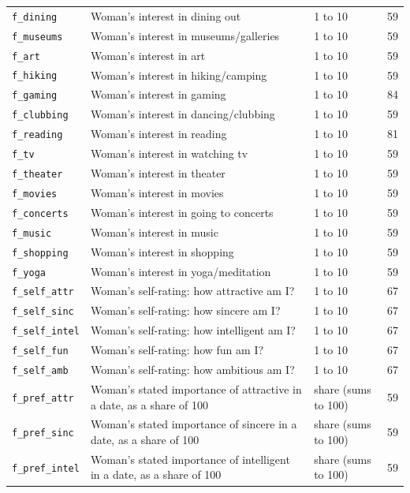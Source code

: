 \documentclass[11pt]{article}
\begin{document}
\begin{longtable}{L{3.3cm}L{8.2cm}L{2.4cm}r}
\texttt{f\_dining} & Woman's interest in dining out & 1 to 10 & 59 \\
\texttt{f\_museums} & Woman's interest in museums/galleries & 1 to 10 & 59 \\
\texttt{f\_art} & Woman's interest in art & 1 to 10 & 59 \\
\texttt{f\_hiking} & Woman's interest in hiking/camping & 1 to 10 & 59 \\
\texttt{f\_gaming} & Woman's interest in gaming & 1 to 10 & 84 \\
\texttt{f\_clubbing} & Woman's interest in dancing/clubbing & 1 to 10 & 59 \\
\texttt{f\_reading} & Woman's interest in reading & 1 to 10 & 81 \\
\texttt{f\_tv} & Woman's interest in watching tv & 1 to 10 & 59 \\
\texttt{f\_theater} & Woman's interest in theater & 1 to 10 & 59 \\
\texttt{f\_movies} & Woman's interest in movies & 1 to 10 & 59 \\
\texttt{f\_concerts} & Woman's interest in going to concerts & 1 to 10 & 59 \\
\texttt{f\_music} & Woman's interest in music & 1 to 10 & 59 \\
\texttt{f\_shopping} & Woman's interest in shopping & 1 to 10 & 59 \\
\texttt{f\_yoga} & Woman's interest in yoga/meditation & 1 to 10 & 59 \\
\texttt{f\_self\_attr} & Woman's self-rating: how attractive am I? & 1 to 10 & 67 \\
\texttt{f\_self\_sinc} & Woman's self-rating: how sincere am I? & 1 to 10 & 67 \\
\texttt{f\_self\_intel} & Woman's self-rating: how intelligent am I? & 1 to 10 & 67 \\
\texttt{f\_self\_fun} & Woman's self-rating: how fun am I? & 1 to 10 & 67 \\
\texttt{f\_self\_amb} & Woman's self-rating: how ambitious am I? & 1 to 10 & 67 \\
\texttt{f\_pref\_attr} & Woman's stated importance of attractive in a date, as a share of 100 & share (sums to 100) & 59 \\
\texttt{f\_pref\_sinc} & Woman's stated importance of sincere in a date, as a share of 100 & share (sums to 100) & 59 \\
\texttt{f\_pref\_intel} & Woman's stated importance of intelligent in a date, as a share of 100 & share (sums to 100) & 59 \\

\end{longtable}
\end{document}

